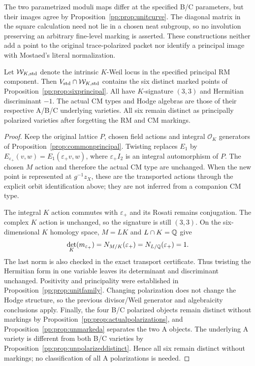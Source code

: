 \begin{remark}\label{pp:rem:unitimage}
The two parametrized moduli maps differ at the specified B/C parameters,
but their images agree by Proposition~\ref{pp:prop:unitcurve}.
The diagonal matrix in the square calculation need not lie in a chosen
neat subgroup, so no involution preserving an arbitrary fine-level
marking is asserted. These constructions neither add a point to the
original trace-polarized packet nor identify a principal image with
Mostaed's literal normalization.
\end{remark}

\begin{corollary}
\label{pp:cor:weilimage}
Let $\mathcal W_{K,\rm std}$ denote the intrinsic $K$-Weil locus in the
specified principal RM component. Then
$V_{\rm std}\cap\mathcal W_{K,\rm std}$ contains the six distinct
marked points of Proposition~\ref{pp:prop:sixprincipal}.
All have $K$-signature $(3,3)$ and Hermitian discriminant $-1$.
The actual CM types and Hodge algebras are those of their respective
A/B/C underlying varieties. All six remain distinct as principally polarized varieties after
forgetting the RM and CM markings.
\end{corollary}
\begin{proof}
Keep the original lattice $P$, chosen field actions and integral
$\mathcal O_K$ generators of Proposition~\ref{prop:commonprincipal}.
Twisting replaces $E_1$ by
$E_{\varepsilon_+}(v,w)=E_1(\varepsilon_+v,w)$, where
$\varepsilon_+I_2$ is an integral automorphism of $P$.
The chosen $M$ action and therefore the actual CM type are unchanged.
When the new point is represented at $g^{-1}z_X$, these are the
transported actions through the explicit orbit identification above;
they are not inferred from a companion CM type.

The integral $K$ action commutes with $\varepsilon_+$ and its Rosati
remains conjugation. The complex $K$ action is unchanged, so the
signature is still $(3,3)$. On the six-dimensional $K$ homology space,
$M=LK$ and $L\cap K=\mathbb Q$ give
\[
 \det_K(m_{\varepsilon_+})
 =N_{M/K}(\varepsilon_+)=N_{L/\mathbb Q}(\varepsilon_+)=1.
\]
The last norm is also checked in the exact transport certificate.
Thus twisting the Hermitian form in one variable leaves its determinant
and discriminant unchanged. Positivity and principality were established
in Proposition~\ref{pp:prop:unitfamily}.
Changing polarization does not change the Hodge structure, so the
previous divisor/Weil generator and algebraicity conclusions apply.
Finally, the four B/C polarized objects remain distinct without markings
by Proposition~\ref{pp:prop:actualpolarizations}, and
Proposition~\ref{pp:prop:unmarkeda} separates the two A objects.
The underlying A variety is different from both B/C varieties by
Proposition~\ref{pp:prop:unpolarizeddistinct}. Hence all six remain
distinct without markings; no classification of all A polarizations
is needed.
\end{proof}

